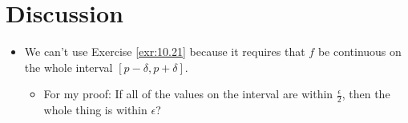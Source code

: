 \documentclass{report}
\begin{document}



\section{Discussion}
\begin{itemize}
    \item We can't use Exercise \ref{exr:10.21} because it requires that $f$ be continuous on the whole interval $[p-\delta,p+\delta]$.
    \begin{itemize}
        \item For my proof: If all of the values on the interval are within $\frac{\epsilon}{2}$, then the whole thing is within $\epsilon$?
    \end{itemize}
\end{itemize}
\end{document}
